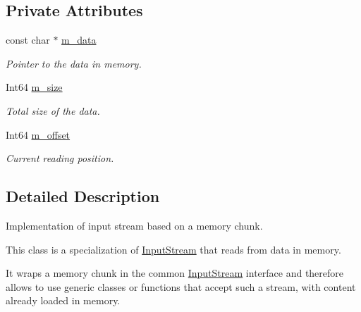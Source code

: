 \subsection*{Private Attributes}
\begin{DoxyCompactItemize}
\item 
\mbox{\label{classsf_1_1_memory_input_stream_a8ad3c69b6db82327116ddd2f2172297b}} 
const char $\ast$ \mbox{\hyperlink{classsf_1_1_memory_input_stream_a8ad3c69b6db82327116ddd2f2172297b}{m\+\_\+data}}
\begin{DoxyCompactList}\small\item\em Pointer to the data in memory. \end{DoxyCompactList}\item 
\mbox{\label{classsf_1_1_memory_input_stream_af6e2785bac97d2da74206590b31bae58}} 
Int64 \mbox{\hyperlink{classsf_1_1_memory_input_stream_af6e2785bac97d2da74206590b31bae58}{m\+\_\+size}}
\begin{DoxyCompactList}\small\item\em Total size of the data. \end{DoxyCompactList}\item 
\mbox{\label{classsf_1_1_memory_input_stream_afe32a3be4ff1184b7a7e69aa5d6ec128}} 
Int64 \mbox{\hyperlink{classsf_1_1_memory_input_stream_afe32a3be4ff1184b7a7e69aa5d6ec128}{m\+\_\+offset}}
\begin{DoxyCompactList}\small\item\em Current reading position. \end{DoxyCompactList}\end{DoxyCompactItemize}


\subsection{Detailed Description}
Implementation of input stream based on a memory chunk. 

\begin{DoxyVerb}\end{DoxyVerb}


This class is a specialization of \mbox{\hyperlink{classsf_1_1_input_stream}{Input\+Stream}} that reads from data in memory.

It wraps a memory chunk in the common \mbox{\hyperlink{classsf_1_1_input_stream}{Input\+Stream}} interface and therefore allows to use generic classes or functions that accept such a stream, with content already loaded in memory.

